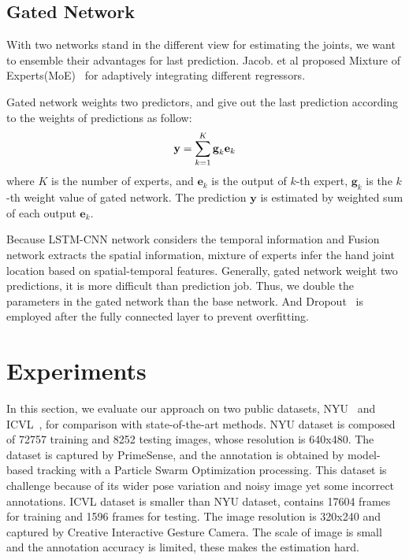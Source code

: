 \documentclass[journal,comsoc]{IEEEtran}
\let\MYoriglatexcaption\caption
\renewcommand{\caption}[2][\relax]{\MYoriglatexcaption[#2]{#2}}
\begin{document}
\subsection{Gated Network}\label{sec:gated network}
With two networks stand in the different view for estimating the joints, we want to ensemble their advantages for last prediction.
Jacob. et al proposed Mixture of Experts(MoE)~\cite{jacobs1991adaptive} for adaptively integrating different regressors.

Gated network weights two predictors, and give out the last prediction according to the weights of predictions as follow:
\begin{equation}\label{eq:gated network}
\centering
\textbf{y} = \sum_{k=1}^K \textbf{g}_k \textbf{e}_k
\end{equation}
where $K$ is the number of experts, and $\textbf{e}_k$ is the output of $k$-th expert, $\textbf{g}_k$ is the $k$-th weight value of
gated network. The prediction $\textbf{y}$ is estimated by weighted sum of each output $\textbf{e}_k$.

Because LSTM-CNN network considers the temporal information and Fusion network extracts the spatial information, mixture of experts
infer the hand joint location based on spatial-temporal features. Generally, gated network weight two predictions, it is more difficult
than prediction job. Thus, we double the parameters in the gated network than the base network. And Dropout~\cite{srivastava2014dropout}
is employed after the fully connected layer to prevent overfitting.




\section{Experiments}\label{sec:experiments}
In this section, we evaluate our approach on two public datasets, NYU~\cite{tompson2014real} and ICVL~\cite{tang2014latent}, for comparison 
with state-of-the-art methods. NYU dataset is composed of 72757 training and 8252 testing images, whose resolution is 640x480. The dataset 
is captured by PrimeSense, and the annotation is obtained by model-based tracking with a Particle Swarm Optimization processing. This dataset 
is challenge because of its wider pose variation and noisy image yet some incorrect annotations. ICVL dataset is smaller than NYU dataset, contains 
17604 frames for training and 1596 frames for testing. The image resolution is 320x240 and captured by Creative Interactive Gesture Camera. The scale 
of image is small and the annotation accuracy is limited, these makes the estimation hard.
\end{document}
